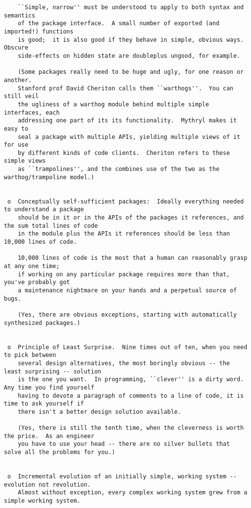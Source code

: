 \begin{verbatim}
    ``Simple, narrow'' must be understood to apply to both syntax and semantics
    of the package interface.  A small number of exported (and imported!) functions
    is good;  it is also good if they behave in simple, obvious ways.  Obscure
    side-effects on hidden state are doubleplus ungood, for example.

    (Some packages really need to be huge and ugly, for one reason or another.
    Stanford prof David Cheriton calls them ``warthogs''.  You can still veil
    the ugliness of a warthog module behind multiple simple interfaces, each
    addressing one part of its its functionality.  Mythryl makes it easy to
    seal a package with multiple APIs, yielding multiple views of it for use
    by different kinds of code clients.  Cheriton refers to these simple views
    as ``trampolines'', and the combines use of the two as the warthog/trampoline model.)


 o  Conceptually self-sufficient packages:  Ideally everything needed to understand a package
    should be in it or in the APIs of the packages it references, and the sum total lines of code
    in the module plus the APIs it references should be less than 10,000 lines of code.

    10,000 lines of code is the most that a human can reasonably grasp at any one time;
    if working on any particular package requires more than that, you've probably got
    a maintenance nightmare on your hands and a perpetual source of bugs.

    (Yes, there are obvious exceptions, starting with automatically synthesized packages.)


 o  Principle of Least Surprise.  Nine times out of ten, when you need to pick between
    several design alternatives, the most boringly obvious -- the least surprising -- solution
    is the one you want.  In programming, ``clever'' is a dirty word.  Any time you find yourself
    having to devote a paragraph of comments to a line of code, it is time to ask yourself if
    there isn't a better design solution available.  

    (Yes, there is still the tenth time, when the cleverness is worth the price.  As an engineer
    you have to use your head -- there are no silver bullets that solve all the problems for you.)


 o  Incremental evolution of an initially simple, working system -- evolution not revolution.
    Almost without exception, every complex working system grew from a simple working system.


\end{verbatim}
